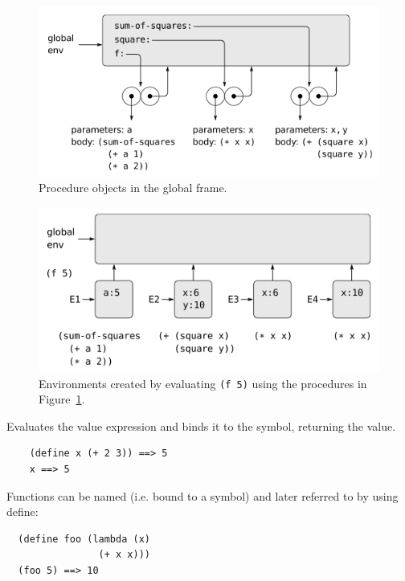 \documentclass[12pt]{article}
\begin{document}
\begin{figure}[htbp] %
   \centering
   \includegraphics[width=5in]{function_declarations.png}
\caption{Procedure objects in the global frame.}
\label{fig:funcdefs}
\end{figure}

\begin{figure}[htbp] %
   \centering
   \includegraphics[width=5in]{function_invocations.png}
\caption[Invocation Environments]{Environments created by evaluating
  {\tt (f 5)} using the procedures in Figure~\ref{fig:funcdefs}.}
\label{fig:funcinvocations}
\end{figure}



Evaluates the value expression and binds it to the symbol, returning
the value.

\begin{verbatim}
    (define x (+ 2 3)) ==> 5
    x ==> 5
\end{verbatim}

Functions can be named (i.e. bound to a symbol) and later referred to
by using define:

\begin{verbatim}
  (define foo (lambda (x)
                (+ x x)))
  (foo 5) ==> 10
\end{verbatim}
\end{document}
